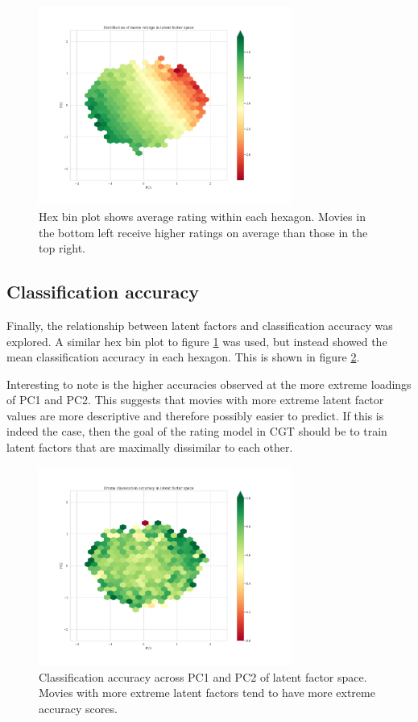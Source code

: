 \begin{figure}[H]
\centering
\includegraphics[width=0.74\textwidth]{Figures/5_ml10m-ratings-hexbin.pdf}
\decoRule
\caption[Average rating hex bin plot in PC1 and 2]{Hex bin plot shows average rating within each hexagon. Movies in the bottom left receive higher ratings on average than those in the top right.}
\label{fig:5-ratings-hexbin}
\end{figure}

\subsection{Classification accuracy}
Finally, the relationship between latent factors and classification accuracy was explored. A similar hex bin plot to figure \ref{fig:5-ratings-hexbin} was used, but instead showed the mean classification accuracy in each hexagon. This is shown in figure \ref{fig:5-accuracy-hexbin}.

Interesting to note is the higher accuracies observed at the more extreme loadings of PC1 and PC2. This suggests that movies with more extreme latent factor values are more descriptive and therefore possibly easier to predict. If this is indeed the case, then the goal of the rating model in CGT should be to train latent factors that are maximally dissimilar to each other.

\begin{figure}[H]
\centering
\includegraphics[width=0.74\textwidth]{Figures/5_ml10m-accuracy-hexbin.pdf}
\decoRule
\caption[Classification accuracy hex bin plot in PC1 and 2]{Classification accuracy across PC1 and PC2 of latent factor space. Movies with more extreme latent factors tend to have more extreme accuracy scores.}
\label{fig:5-accuracy-hexbin}
\end{figure}